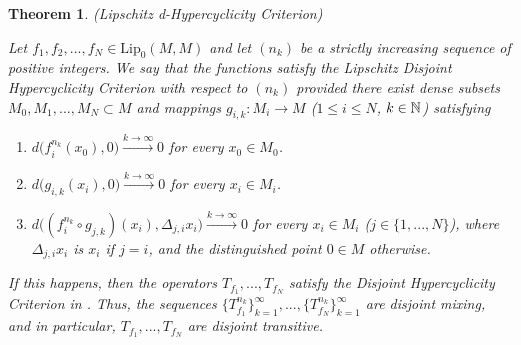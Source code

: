 \documentclass[11pt,reqno]{article}
\newtheorem{theorem}[statement]{Theorem}
\def\lip{ \text{Lip}}
\def\NN{\Bbb N}
\def\dd{\delta}
\begin{document}
\begin{theorem}(Lipschitz d-Hypercyclicity Criterion)\label{thm:lip-d-hcc}

Let $f_1,f_2,...,f_N\in \lip_0(M,M)$ and let $(n_k)$ be a strictly increasing sequence of positive integers. We say that the functions satisfy the Lipschitz Disjoint Hypercyclicity Criterion with respect to $(n_k)$ provided there exist dense subsets $M_0,M_1,...,M_N\subset M$ and mappings $g_{i,k}:M_i\to M$ ($1\leq i\leq N$, $k\in \NN$) satisfying

\begin{enumerate}
    \item[\em($i$)] $d\big(f_{i}^{n_k}(x_0),0\big) \xrightarrow{k\to \infty} 0$ for every $x_0\in M_0$.
    \item[\em($ii$)] $d\big(g_{i,k} (x_i),0\big) \xrightarrow{k\to \infty} 0$ for every $x_i\in M_i$.
    \item[\em($iii$)]  $d\big((f_{i}^{n_k} \circ g_{j,k}) (x_i), \Delta_{j,i}x_i \big) \xrightarrow{k\to \infty} 0$ for every $x_i\in M_i$ ($j\in \{1,...,N\}$), where $\Delta_{j,i}x_i$ is $x_i$ if $j=i$, and the distinguished point $0\in M$ otherwise.
\end{enumerate}

If this happens, then the operators $T_{f_1},...,T_{f_N}$ satisfy the Disjoint Hypercyclicity Criterion in \cite{BesPeris07}. Thus, the sequences $\{T_{f_1}^{n_k}\}_{k=1}^\infty,...,\{T_{f_N}^{n_k}\}_{k=1}^\infty$ are disjoint mixing, and in particular, $T_{f_1},...,T_{f_N}$ are disjoint transitive.
\end{theorem}
\end{document}
